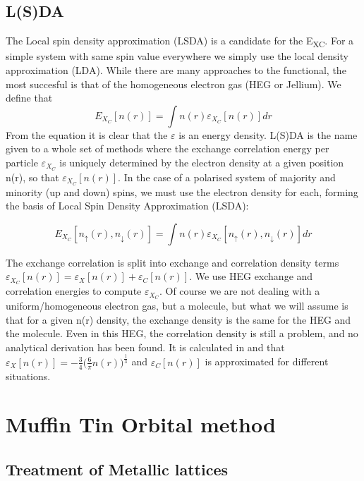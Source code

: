 \documentclass[12pt]{article}
\begin{document}
\subsection{L(S)DA}

The Local spin density approximation (LSDA) is a candidate for the E\textsubscript{XC}. For a simple system with same spin value everywhere we simply use the local density approximation (LDA). While there are many approaches to the functional, the most succesful is that of the homogeneous electron gas (HEG or Jellium). %
We define that
$$E_X_C[n(r)]=\int n(r) \varepsilon_X_C[n(r)] dr$$
From the equation it is clear that the $\varepsilon$ is an energy density. L(S)DA is the name given to a whole set of methods where the exchange correlation energy per particle $\varepsilon_X_C$ is uniquely determined by the electron density at a given position n(r), so that $\varepsilon_X_C[n(r)]$.
In the case of a polarised system of majority and minority (up and down) spins, we must use the electron density for each, forming the basis of Local Spin Density Approximation (LSDA):

$$E_X_C[n_\uparrow(r),n_\downarrow(r)]=\int n(r) \varepsilon_X_C[n_\uparrow(r),n_\downarrow(r)] dr$$


The exchange correlation is split into exchange and correlation density terms $\varepsilon_X_C[n(r)]=\varepsilon_X[n(r)]+\varepsilon_C[n(r)]$.
We use HEG exchange and correlation energies to compute $\varepsilon_X_C$. Of course we are not dealing with a uniform/homogeneous electron gas, but a molecule, but what we will assume is that for a given n(r) density, the exchange density is the same for the HEG and the molecule. Even in this HEG, the correlation density is still a problem, and no analytical derivation has been found. It is calculated in \cite{martin} and \cite{exc} that $\varepsilon_X[n(r)]=-\frac{3}{4}\bigg(\frac{6}{\pi}n(r)\bigg)^\frac{1}{3}$ and $\varepsilon_C[n(r)]$ is approximated for different situations.

\clearpage
\section{Muffin Tin Orbital method}%
\subsection{Treatment of Metallic lattices}
\end{document}
